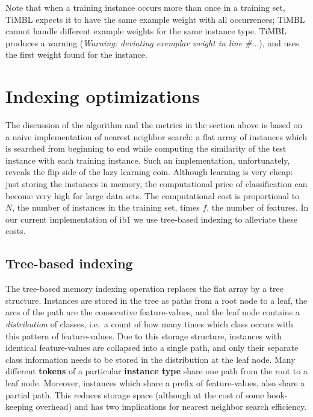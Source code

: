 \documentclass{book}
\begin{document}
Note that when a training instance occurs more than once in a training
set, TiMBL expects it to have the same example weight with all
occurrences; TiMBL cannot handle different example weights for the
same instance type. TiMBL produces a warning ({\em Warning: deviating
  exemplar weight in line \#$\ldots$}), and uses the first weight found for
the instance.

\section{Indexing optimizations}
\label{indexing}

The discussion of the algorithm and the metrics in the section above
is based on a naive implementation of nearest neighbor search: a flat
array of instances which is searched from beginning to end while
computing the similarity of the test instance with each training
instance. Such an implementation, unfortunately, reveals the flip side
of the lazy learning coin. Although learning is very cheap: just
storing the instances in memory, the computational price of
classification can become very high for large data sets. The
computational cost is proportional to $N$, the number of instances in
the training set, times $f$, the number of features. In our current
implementation of {\sc ib1} we use tree-based indexing to alleviate
these costs.

\subsection{Tree-based indexing}

The tree-based memory indexing operation replaces the flat array
by a tree structure. Instances are stored in the tree as
paths from a root node to a leaf, the arcs of the path are the
consecutive feature-values, and the leaf node contains a {\em
distribution}\/ of classes, i.e.~a count of how many times which class
occurs with this pattern of feature-values. %
Due to this storage structure, instances with identical feature-values
are collapsed into a single path, and only their separate class
information needs to be stored in the distribution at the leaf
node. Many different {\bf tokens} of a particular {\bf instance type}
share one path from the root to a leaf node. Moreover, instances which
share a prefix of feature-values, also share a partial path. This
reduces storage space (although at the cost of some book-keeping
overhead) and has two implications for nearest neighbor search
efficiency.
\end{document}
